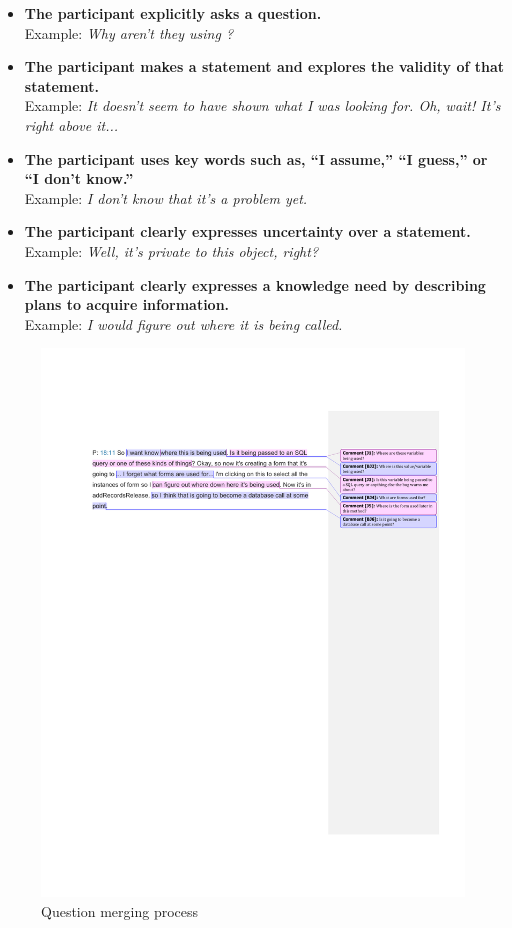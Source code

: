 \documentclass{acm_proc_article-sp}
\newcommand{\compresslist}{
	\vspace{-1em}
	\setlength{\itemsep}{1pt}
	\setlength{\parskip}{0pt}
	\setlength{\parsep}{0pt}
}
\begin{document}
\begin{itemize}
\compresslist	
\item \textbf{The participant explicitly asks a question.}
\\ Example: \textit{Why aren't they using ?}
\item \textbf{The participant makes a statement and explores the validity of that statement.}
\\ Example: \textit{It doesn't seem to have shown what I was looking for. Oh, wait! It's right above it...}
\item \textbf{The participant uses key words such as, ``I assume,'' ``I guess,'' or ``I don't know.''}
\\ Example: \textit{I don't know that it's a problem yet.}
\item \textbf{The participant clearly expresses uncertainty over a statement.}
\\ Example: \textit{Well, it's private to this object, right?}
\item \textbf{The participant clearly expresses a knowledge need by describing plans to acquire information.}
\\ Example: \textit{I would figure out where it is being called.}

\end{itemize}

\begin{figure}
	\centering
	\includegraphics[width=7.5in]{Images/QuestionMerging}
	\caption{Question merging process}
	\label{fig:merging} 
\end{figure}
\end{document}
